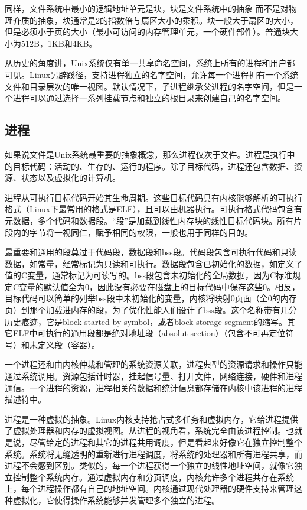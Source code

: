 同样，文件系统中最小的逻辑地址单元是块，块是文件系统中的抽象 而不是对物理介质的抽象，块通常是2的指数倍与扇区大小的乘积。块一般大于扇区的大小，但是必须小于页的大小（最小可访问的内存管理单元，一个硬件部件）。普通块大小为512B，1KB和4KB。

从历史的角度讲，Unix系统仅有单一共享命名空间，系统上所有的进程和用户都可见。Linux另辟蹊径，支持进程独立的名字空间，允许每一个进程拥有一个系统文件和目录层次的唯一视图。默认情况下，子进程继承父进程的名字空间，但是一个进程可以通过选择一系列挂载节点和独立的根目录来创建自己的名字空间。

\subsection{进程}

如果说文件是Unix系统最重要的抽象概念，那么进程仅次于文件。进程是执行中的目标代码：活动的、生存的、运行的程序。除了目标代码，进程还包含数据、资源、状态以及虚拟化的计算机。

进程从可执行目标代码开始其生命周期。这些目标代码具有内核能够解析的可执行格式（Linux下最常用的格式是ELF），且可以由机器执行。可执行格式代码包含有元数据，多个代码和数据段。“段”是加载到线性内存块的线性目标代码块。所有片段内的字节将一视同仁，赋予相同的权限，一般也用于同样的目的。

最重要和通用的段莫过于代码段，数据段和bss段。代码段包含可执行代码和只读数据，如常量，经常标记为只读和可执行。数据段包含已初始化的数据，如定义了值的C变量，通常标记为可读写的。bss段包含未初始化的全局数据，因为C标准规定C变量的默认值全为0，因此没有必要在磁盘上的目标代码中保存这些0。相反，目标代码可以简单的列举bss段中未初始化的变量，内核将映射0页面（全0的内存页）到那个加载进内存的段，为了优化性能人们设计了bss段。这个名称带有几分历史痕迹，它是block started by symbol，或者block storage segment的缩写。其它ELF中可执行的通用段都是绝对地址段（absolut section）（包含不可再定位符号）和未定义段（容器）。

一个进程还和由内核仲裁和管理的系统资源关联，进程典型的资源请求和操作只能通过系统调用。资源包括计时器，挂起信号量、打开文件，网络连接，硬件和进程通信。一个进程的资源，进程相关的数据和统计信息都存储在内核中该进程的进程描述符中。

进程是一种虚拟的抽象。Linux内核支持抢占式多任务和虚拟内存，它给进程提供了虚拟处理器和内存的虚拟视图。从进程的视角看，系统完全由该进程控制。也就是说，尽管给定的进程和其它的进程共用调度，但是看起来好像它在独立控制整个系统。系统将无缝透明的重新进行进程调度，将系统的处理器和所有进程共享，而进程不会感到区别。类似的，每一个进程获得一个独立的线性地址空间，就像它独立控制整个系统内存。通过虚拟内存和分页调度，内核允许多个进程共存在系统上，每个进程操作都有自己的地址空间。内核通过现代处理器的硬件支持来管理这种虚拟化，它使得操作系统能够并发管理多个独立的进程。


